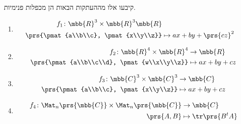 \documentclass[a4paper,10pt,twoside,openany]{book}
\begin{document}
\begin{exercisechap}
קיבעו אלו מההעתקות הבאות הן מכפלות פנימיות.

\begin{enumerate}
\item
\begin{align*}
f_1 \colon \mbb{R}^3 \times \mbb{R}^3 \mbb{R} \\
\prs{\pmat{a\\b\\c}, \pmat{x\\y\\z}} &\mapsto ax + by + \prs{cz}^2
\end{align*}

\item
\begin{align*}
f_2 \colon \mbb{R}^4 \times \mbb{R}^4 &\to \mbb{R} \\
\prs{\pmat{a\\b\\c\\d}, \pmat{w\\x\\y\\z}} &\mapsto ax + by + cz 
\end{align*}

\item
\begin{align*}
f_3 \colon \mbb{C}^3 \times \mbb{C}^3 &\to \mbb{C} \\
\prs{\pmat{a\\b\\c}, \pmat{x\\y\\z}} &\mapsto ax + by + cz
\end{align*}

\item
\begin{align*}
f_4 \colon \Mat_n\prs{\mbb{C}} \times \Mat_n\prs{\mbb{C}} &\to \mbb{C} \\
\prs{A,B} &\mapsto \tr\prs{B^t A}
\end{align*}
\end{enumerate}
\end{exercisechap}
\end{document}
